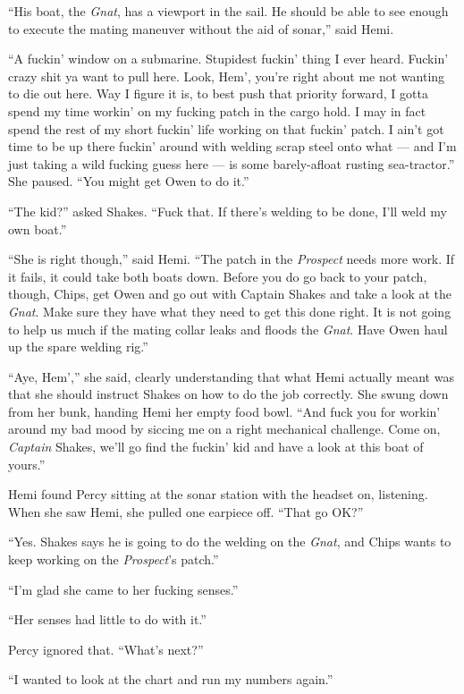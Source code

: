 \documentclass[
]{scrbook}
\begin{document}
``His boat, the \emph{Gnat}, has a viewport in the sail. He should be
able to see enough to execute the mating maneuver without the aid of
sonar,'' said Hemi.

``A fuckin' window on a submarine. Stupidest fuckin' thing I ever heard.
Fuckin' crazy shit ya want to pull here. Look, Hem', you're right about
me not wanting to die out here. Way I figure it is, to best push that
priority forward, I gotta spend my time workin' on my fucking patch in
the cargo hold. I may in fact spend the rest of my short fuckin' life
working on that fuckin' patch. I ain't got time to be up there fuckin'
around with welding scrap steel onto what --- and I'm just taking a wild
fucking guess here --- is some barely-afloat rusting sea-tractor.'' She
paused. ``You might get Owen to do it.''

``The kid?'' asked Shakes. ``Fuck that. If there's welding to be done,
I'll weld my own boat.''

``She is right though,'' said Hemi. ``The patch in the \emph{Prospect}
needs more work. If it fails, it could take both boats down. Before you
do go back to your patch, though, Chips, get Owen and go out with
Captain Shakes and take a look at the \emph{Gnat}. Make sure they have
what they need to get this done right. It is not going to help us much
if the mating collar leaks and floods the \emph{Gnat}. Have Owen haul up
the spare welding rig.''

``Aye, Hem','' she said, clearly understanding that what Hemi actually
meant was that she should instruct Shakes on how to do the job
correctly. She swung down from her bunk, handing Hemi her empty food
bowl. ``And fuck you for workin' around my bad mood by siccing me on a
right mechanical challenge. Come on, \emph{Captain} Shakes, we'll go
find the fuckin' kid and have a look at this boat of yours.''

\bigskip

Hemi found Percy sitting at the sonar station with the headset on,
listening. When she saw Hemi, she pulled one earpiece off. ``That go
OK?''

``Yes. Shakes says he is going to do the welding on the \emph{Gnat}, and
Chips wants to keep working on the \emph{Prospect}'s patch.''

``I'm glad she came to her fucking senses.''

``Her senses had little to do with it.''

Percy ignored that. ``What's next?''

``I wanted to look at the chart and run my numbers again.''
\end{document}
